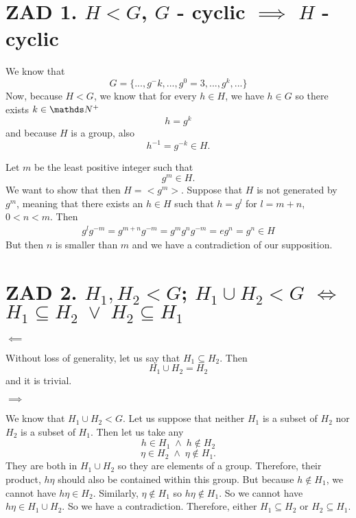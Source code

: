 \documentclass{article}
\begin{document}
    \section*{ZAD 1. $H<G$, $G$ - cyclic $\implies$ $H$ - cyclic}

    We know that
    $$G=\{..., g^-k,...,g^0=3,...,g^k,...\}$$
    Now, because $H<G$, we know that for every $h\in H$, we have $h\in G$ so there exists $k\in\N^+$
    $$h=g^k$$
    and because $H$ is a group, also 
    $$h^{-1}=g^{-k}\in H.$$
    
    Let $m$ be the least positive integer such that
    $$g^m\in H.$$
    We want to show that then $H=<g^m>$. Suppose that $H$ is not generated by $g^m$, meaning that there exists an $h\in H$ such that $h=g^l$ for $l=m+n$, $0<n<m$. Then
    \begin{align*}
        g^l g^{-m}=g^{m+n}g^{-m}=g^mg^ng^{-m}=eg^n=g^n\in H
    \end{align*}
    But then $n$ is smaller than $m$ and we have a contradiction of our supposition.


    \section*{ZAD 2. $H_1,H_2<G$; $H_1\cup H_2<G$ $\iff$ $H_1\subseteq H_2\;\lor\;H_2\subseteq H_1$}

    $\impliedby$
    \smallskip

    Without loss of generality, let us say that $H_1\subseteq H_2$. Then
    $$H_1\cup H_2=H_2$$
    and it is trivial.
    \medskip

    $\implies$
    \smallskip

    We know that $H_1\cup H_2<G$. Let us suppose that neither $H_1$ is a subset of $H_2$ nor $H_2$ is a subset of $H_1$. Then let us take any
    $$h\in H_1\;\land\;h\notin H_2$$
    $$\eta\in H_2\;\land\;\eta\notin H_1.$$
    They are both in $H_1\cup H_2$ so they are elements of a group. Therefore, their product, $h\eta$ should also be contained within this group. But because $h\notin H_1$, we cannot have $h\eta\in H_2$. Similarly, $\eta\notin H_1$ so $h\eta\notin H_1$. So we cannot have $h\eta\in H_1\cup H_2$. So we have a contradiction. Therefore, either $H_1\subseteq H_2$ or $H_2\subseteq H_1$.
\end{document}
